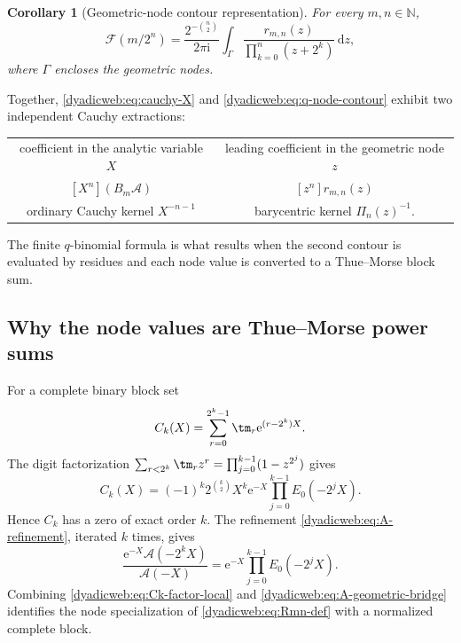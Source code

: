 \documentclass[11pt,oneside]{article}
\newtheorem{corollary}[theorem]{Corollary}
\theoremstyle{definition}
\theoremstyle{remark}
\newcommand{\N}{\mathbb N}
\newcommand{\e}{\mathrm e}
\newcommand{\ii}{\mathrm i}
\newcommand{\dd}{\,\mathrm d}
\begin{document}
\begin{corollary}[Geometric-node contour representation]
\label{dyadicweb:cor:q-node-contour}
For every $m,n\in\N$,
\begin{equation}
 \boxed{
 \mathcal F(m/2^n)=
 \frac{2^{-\binom n2}}{2\pi\ii}
 \int_\Gamma
 \frac{r_{m,n}(z)}{\prod_{k=0}^{n}(z+2^k)}\dd z,}          \label{dyadicweb:eq:q-node-contour}
\end{equation}
where $\Gamma$ encloses the geometric nodes.
\end{corollary}

Together, \eqref{dyadicweb:eq:cauchy-X} and \eqref{dyadicweb:eq:q-node-contour} exhibit two independent Cauchy
extractions:
\begin{center}
\begin{tabular}{c@{\qquad}c}
coefficient in the analytic variable $X$
& leading coefficient in the geometric node $z$ \\
$[X^n](B_m\mathscr A)$
& $[z^n]r_{m,n}(z)$ \\
ordinary Cauchy kernel $X^{-n-1}$
& barycentric kernel $\Pi_n(z)^{-1}$.
\end{tabular}
\end{center}
The finite $q$-binomial formula is what results when the second contour is evaluated by
residues and each node value is converted to a Thue--Morse block sum.

\subsection{Why the node values are Thue--Morse power sums}

For a complete binary block set
\begin{equation}
 C_k(X)=\sum_{r=0}^{2^k-1}\tm_r\e^{(r-2^k)X}.              \label{dyadicweb:eq:Ck-local}
\end{equation}
The digit factorization
\(
 \sum_{r<2^k}\tm_rz^r=\prod_{j=0}^{k-1}(1-z^{2^j})
\)
gives
\begin{equation}
 C_k(X)=(-1)^k2^{\binom k2}X^k
 \e^{-X}\prod_{j=0}^{k-1}E_0(-2^jX).                     \label{dyadicweb:eq:Ck-factor-local}
\end{equation}
Hence $C_k$ has a zero of exact order $k$.  The refinement
\eqref{dyadicweb:eq:A-refinement}, iterated $k$ times, gives
\begin{equation}
 \frac{\e^{-X}\mathscr A(-2^kX)}{\mathscr A(-X)}
 =\e^{-X}\prod_{j=0}^{k-1}E_0(-2^jX).                    \label{dyadicweb:eq:A-geometric-bridge}
\end{equation}
Combining \eqref{dyadicweb:eq:Ck-factor-local} and \eqref{dyadicweb:eq:A-geometric-bridge} identifies the node
specialization of \eqref{dyadicweb:eq:Rmn-def} with a normalized complete block.
\end{document}
